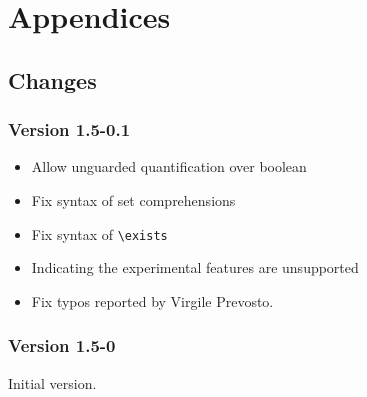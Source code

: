 \documentclass[a4paper,web]{frama-c-book}
\begin{document}








\appendix

\chapter{Appendices}
\label{chap:appendix}


%

%

%

\section{Changes}

\subsection{Version 1.5-0.1}

\begin{itemize}
\item Allow unguarded quantification over boolean
\item Fix syntax of set comprehensions
\item Fix syntax of \lstinline|\exists|
\item Indicating the experimental \acsl features are unsupported
\item Fix typos reported by Virgile Prevosto.
\end{itemize}

\subsection{Version 1.5-0}

Initial version.

\cleardoublepage
{}



\cleardoublepage
{}
\listoffigures

\cleardoublepage
{}
\printindex
\end{document}
